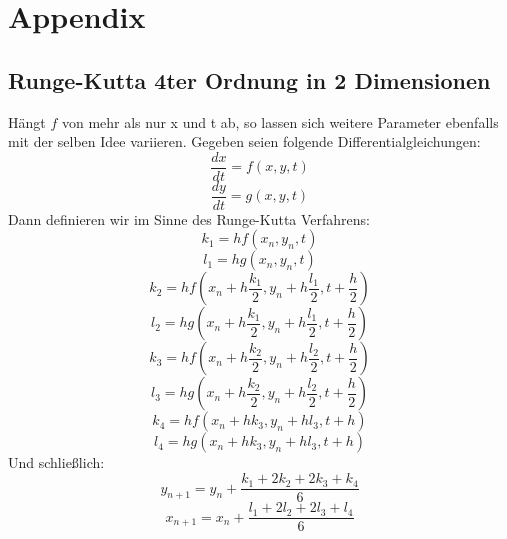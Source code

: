 \documentclass[11,5pt, twoside]{article}
\begin{document}
\section{Appendix}
\subsection {Runge-Kutta 4ter Ordnung in 2 Dimensionen}
Hängt $f$ von mehr als nur x und t ab, so lassen sich weitere Parameter ebenfalls mit der selben Idee variieren.
Gegeben seien folgende Differentialgleichungen:
$$\frac{dx}{dt}=f(x,y,t)$$
$$\frac{dy}{dt}=g(x,y,t)$$
Dann definieren wir im Sinne des Runge-Kutta Verfahrens:
$$k_1 = hf(x_n,y_n,t)$$
$$l_1 = hg(x_n,y_n,t)$$
$$k_2 = hf(x_n+h\frac{k_1}{2},y_n+h\frac{l_1}{2},t+\frac{h}{2})$$
$$l_2 = hg(x_n+h\frac{k_1}{2},y_n+h\frac{l_1}{2},t+\frac{h}{2})$$
$$k_3 = hf(x_n+h\frac{k_2}{2},y_n+h\frac{l_2}{2},t+\frac{h}{2})$$
$$l_3 = hg(x_n+h\frac{k_2}{2},y_n+h\frac{l_2}{2},t+\frac{h}{2})$$
$$k_4 = hf(x_n+hk_3,y_n+hl_3,t+h)$$
$$l_4 = hg(x_n+hk_3,y_n+hl_3,t+h)$$
Und schließlich:
$$y_{n+1} = y_n + \frac{k_1 + 2k_2 + 2k_3 + k_4}{6}$$
$$x_{n+1} = x_n + \frac{l_1 + 2l_2 + 2l_3 + l_4}{6}$$

\nocite{*}
\printbibliography
\end{document}
